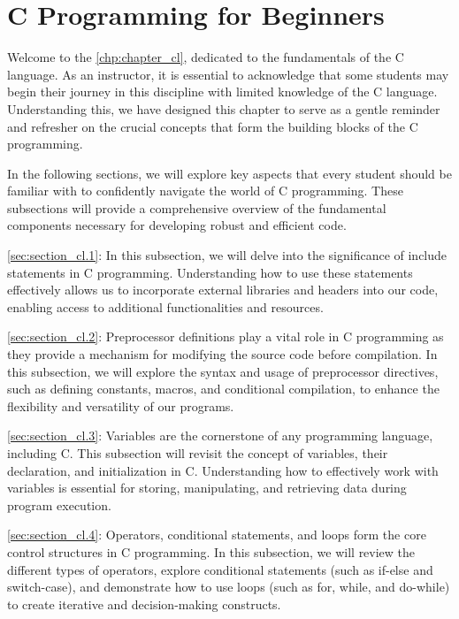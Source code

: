 \chapter{C Programming for Beginners} \label{chp:chapter_cl}

    Welcome to the \autoref{chp:chapter_cl}, dedicated to the fundamentals of the C language. As an instructor, it is essential to acknowledge that some students may begin their journey in this discipline with limited knowledge of the C language. Understanding this, we have designed this chapter to serve as a gentle reminder and refresher on the crucial concepts that form the building blocks of the C programming.
    
    In the following sections, we will explore key aspects that every student should be familiar with to confidently navigate the world of C programming. These subsections will provide a comprehensive overview of the fundamental components necessary for developing robust and efficient code.
    
    \autoref{sec:section_cl.1}:
    In this subsection, we will delve into the significance of include statements in C programming. Understanding how to use these statements effectively allows us to incorporate external libraries and headers into our code, enabling access to additional functionalities and resources.
    
    \autoref{sec:section_cl.2}:
    Preprocessor definitions play a vital role in C programming as they provide a mechanism for modifying the source code before compilation. In this subsection, we will explore the syntax and usage of preprocessor directives, such as defining constants, macros, and conditional compilation, to enhance the flexibility and versatility of our programs.
    
    \autoref{sec:section_cl.3}:
    Variables are the cornerstone of any programming language, including C. This subsection will revisit the concept of variables, their declaration, and initialization in C. Understanding how to effectively work with variables is essential for storing, manipulating, and retrieving data during program execution.
    
    \autoref{sec:section_cl.4}:
    Operators, conditional statements, and loops form the core control structures in C programming. In this subsection, we will review the different types of operators, explore conditional statements (such as if-else and switch-case), and demonstrate how to use loops (such as for, while, and do-while) to create iterative and decision-making constructs.
    
